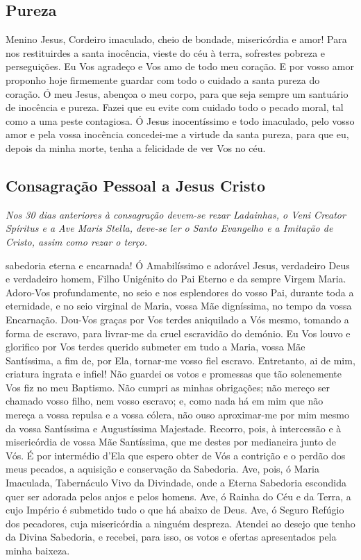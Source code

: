 \subsection{Pureza}
 Menino Jesus, Cordeiro imaculado, cheio de bondade, misericórdia e amor! Para nos restituirdes a santa inocência, vieste do céu à terra, sofrestes pobreza e perseguições. Eu Vos agradeço e Vos amo de todo meu coração. E por vosso amor proponho hoje firmemente guardar com todo o cuidado a santa pureza do coração. Ó meu Jesus, abençoa o meu corpo, para que seja sempre um santuário de inocência e pureza. Fazei que eu evite com cuidado todo o pecado moral, tal como a uma peste contagiosa. Ó Jesus inocentíssimo e todo imaculado, pelo vosso amor e pela vossa inocência concedei-me a virtude da santa pureza, para que eu, depois da minha morte, tenha a felicidade de ver Vos no céu.

\subsection{Consagração Pessoal a Jesus Cristo}
\emph{Nos 30 dias anteriores à consagração devem-se rezar Ladainhas, o Veni Creator Spíritus e a Ave Maris Stella, deve-se ler o Santo Evangelho e a Imitação de Cristo, assim como rezar o terço.}\par

 sabedoria eterna e encarnada! Ó Amabilíssimo e adorável Jesus, verdadeiro Deus e verdadeiro homem, Filho Unigénito do Pai Eterno e da sempre Virgem Maria.
Adoro-Vos profundamente, no seio e nos esplendores do vosso Pai, durante toda a eternidade, e no seio virginal de Maria, vossa Mãe digníssima, no tempo da vossa Encarnação.
Dou-Vos graças por Vos terdes aniquilado a Vós mesmo, tomando a forma de escravo, para livrar-me da cruel escravidão do demónio.
Eu Vos louvo e glorifico por Vos terdes querido submeter em tudo a Maria, vossa Mãe Santíssima, a fim de, por Ela, tornar-me vosso fiel escravo.
Entretanto, ai de mim, criatura ingrata e infiel! Não guardei os votos e promessas que tão solenemente Vos fiz no meu Baptismo. Não cumpri as minhas obrigações; não mereço ser chamado vosso filho, nem vosso escravo; e, como nada há em mim que não mereça a vossa repulsa e a vossa cólera, não ouso aproximar-me por mim mesmo da vossa Santíssima e Augustíssima Majestade.
Recorro, pois, à intercessão e à misericórdia de vossa Mãe Santíssima, que me destes por medianeira junto de Vós. É por intermédio d’Ela que espero obter de Vós a contrição e o perdão dos meus pecados, a aquisição e conservação da Sabedoria.
Ave, pois, ó Maria Imaculada, Tabernáculo Vivo da Divindade, onde a Eterna Sabedoria escondida quer ser adorada pelos anjos e pelos homens.
Ave, ó Rainha do Céu e da Terra, a cujo Império é submetido tudo o que há abaixo de Deus.
Ave, ó Seguro Refúgio dos pecadores, cuja misericórdia a ninguém despreza. Atendei ao desejo que tenho da Divina Sabedoria, e recebei, para isso, os votos e ofertas apresentados pela minha baixeza.

